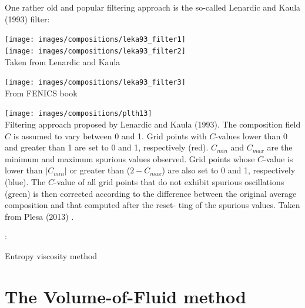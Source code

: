 One rather old and popular filtering approach is the so-called Lenardic and Kaula (1993) \cite{leka93}
filter:

\begin{center}
\texttt{[image: images/compositions/leka93\_filter1]}\\
\texttt{[image: images/compositions/leka93\_filter2]}\\
{\captionfont Taken from Lenardic and Kaula \cite{leka93}}
\end{center}

\begin{center}
\texttt{[image: images/compositions/leka93\_filter3]}\\
{\captionfont From FENICS book}
\end{center}


\begin{center}
\texttt{[image: images/compositions/plth13]}\\
{\captionfont 
Filtering approach proposed by Lenardic and Kaula (1993). 
The composition field $C$ is assumed to vary between 0 and 1. Grid points with $C$-values 
lower than 0 and greater than 1 are set to 0 and 1, respectively (red). 
$C_{min}$ and $C_{max}$ are the minimum and maximum spurious values observed. 
Grid points whose $C$-value is lower than $|C_{min}|$ or greater than ($2-C_{max}$) 
are also set to 0 and 1, respectively (blue). 
The $C$-value of all grid points that do not exhibit spurious oscillations (green) is then corrected
according to the difference between the original average composition and that computed after the reset-
ting of the spurious values.
Taken from Plesa \etal (2013) \cite{plth13}.}
\end{center}











\Literature: \cite{vyrc13}

Entropy viscosity method \cite{gupa11}







\section{The Volume-of-Fluid method} 

